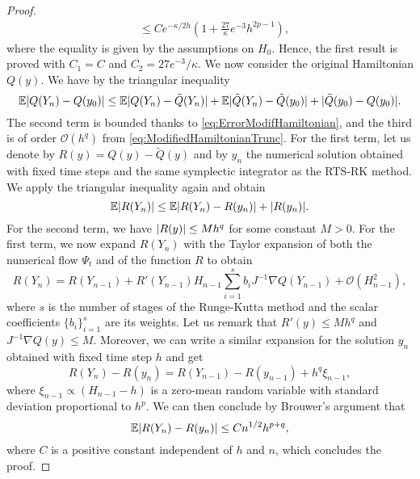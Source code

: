 \documentclass{siamart1116}
\numberwithin{theorem}{section}
\DeclarePairedDelimiter{\abs}{\lvert}{\rvert}
\newcommand{\OO}{\mathcal{O}}
\newcommand{\E}{\operatorname{\mathbb{E}}}
\newcommand{\corr}[1]{{\color{red}#1}}
\begin{document}
\begin{proof}
\begin{equation}
\begin{aligned}
&\leq Ce^{-\kappa/2h}(1 + \frac{27}{\kappa}e^{-3} h^{2p-1}),
\end{aligned}
\end{equation}
where the equality is given by the assumptions on $H_0$. Hence, the first result is proved with $C_1 = C$ and $C_2 = 27e^{-3}/\kappa$. We now consider the original Hamiltonian $Q(y)$. We have by the triangular inequality
\begin{equation}
	\E\abs{Q(Y_n) - Q(y_0)} \leq \E\abs{Q(Y_n) - \tilde Q(Y_n)} + \E\abs{\tilde Q(Y_n) - \tilde Q(y_0)} + \abs{\tilde Q(y_0) - Q(y_0)}.
\end{equation}
The second term is bounded thanks to \eqref{eq:ErrorModifHamiltonian}, and the third is of order $\OO(h^q)$ from \eqref{eq:ModifiedHamiltonianTrunc}. For the first term, let us denote by $R(y) = Q(y) - \tilde Q(y)$ and by $y_n$ the numerical solution obtained with fixed time steps and the same symplectic integrator as the RTS-RK method. We apply the triangular inequality again and obtain
\begin{equation}
	\E\abs{R(Y_n)} \leq \E\abs{R(Y_n) - R(y_n)} + \abs{R(y_n)}.
\end{equation}
For the second term, we have $\abs{R(y)} \leq Mh^q$ for some constant $M > 0$. For the first term, we now expand $R(Y_n)$ with the Taylor expansion of both the numerical flow $\Psi_t$ and of the function $R$ to obtain
\begin{equation}
	R(Y_n) = R(Y_{n-1}) + R'(Y_{n-1})H_{n-1}\sum_{i=1}^{s}b_i J^{-1}\nabla Q(Y_{n-1}) + \OO(H_{n-1}^2),
\end{equation} 
\corr{where $s$ is the number of stages of the Runge-Kutta method and the scalar coefficients $\{b_i\}_{i=1}^s$ are its weights}. Let us remark that $R'(y) \leq M h^q$ and $J^{-1}\nabla Q(y) \leq M$. Moreover, we can write a similar expansion for the solution $y_n$ obtained with fixed time step $h$ and get
\begin{equation}
	R(Y_n) - R(y_n) = R(Y_{n-1}) - R(y_{n-1}) + h^q \xi_{n-1},
\end{equation}
where $\xi_{n-1} \propto (H_{n-1} - h)$ is a zero-mean random variable with standard deviation proportional to \corr{$h^p$}. We can then conclude by Brouwer's argument that
\begin{equation}
	\E\abs{R(Y_n) - R(y_n)} \leq C n^{1/2} h^{p+q},
\end{equation}
where $C$ is a positive constant independent of $h$ and $n$, which concludes the proof.
\end{proof}
\end{document}
